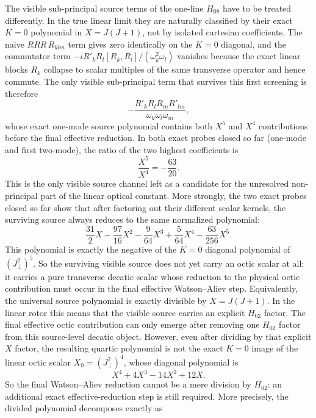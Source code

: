 \documentclass[aip,jcp,reprint,floatfix]{revtex4-2}
\begin{document}
The visible sub-principal source terms of the one-line \(H_{08}\) have to be
treated differently. In the true linear limit they are naturally classified by
their exact \(K=0\) polynomial in \(X=J(J+1)\), not by isolated cartesian
coefficients. The naive \(RRR\,R_{klm}\) term gives zero identically on the
\(K=0\) diagonal, and the commutator term
\(-iR'_kR_l[R_k,R_l]/(\omega_k^2\omega_l)\) vanishes because the exact linear
blocks \(R_k\) collapse to scalar multiples of the same transverse operator and
hence commute. The only visible sub-principal term that survives this first
screening is therefore
\[
-\frac{R'_kR_lR_mR'_{lm}}{\omega_k\omega_l\omega_m},
\]
whose exact one-mode source polynomial contains both \(X^5\) and \(X^4\)
contributions before the final effective reduction. In both exact probes closed
so far (one-mode and first two-mode), the ratio of the two highest coefficients
is
\[
\frac{X^5}{X^4}=-\frac{63}{20}.
\]
This is the only visible
source channel left as a candidate for the unresolved non-principal part of the
linear optical constant.
More strongly, the two exact probes closed so far show that after factoring out
their different scalar kernels, the surviving source always reduces to the same
normalized polynomial:
\begin{equation}
\frac{31}{2}X-\frac{97}{16}X^2-\frac{9}{64}X^3+\frac{5}{64}X^4-\frac{63}{256}X^5.
\end{equation}
This polynomial is exactly the negative of the \(K=0\) diagonal polynomial of
\((J_\perp^2)^5\). So the surviving visible source does not yet carry an octic
scalar at all: it carries a pure transverse decatic scalar whose reduction to
the physical octic contribution must occur in the final effective
Watson--Aliev step.
Equivalently, the universal source polynomial is exactly divisible by
\(X=J(J+1)\). In the linear rotor this means that the visible source carries an
explicit \(H_{02}\) factor. The final effective octic contribution can only
emerge after removing one \(H_{02}\) factor from this source-level decatic
object.
However, even after dividing by that explicit \(X\) factor, the resulting
quartic polynomial is not the exact \(K=0\) image of the linear octic scalar
\(X_0=(J_\perp^2)^4\), whose diagonal polynomial is
\begin{equation}
X^4+4X^3-14X^2+12X.
\end{equation}
So the final Watson--Aliev reduction cannot be a mere division by \(H_{02}\):
an additional exact effective-reduction step is still required.
More precisely, the divided polynomial decomposes exactly as
\end{document}
